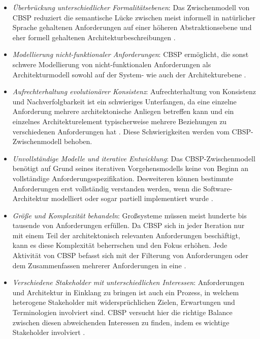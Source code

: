 \begin{itemize}
\item \textit{\"Uberbr\"uckung unterschiedlicher Formalit\"atsebenen}: Das Zwischenmodell von CBSP reduziert die semantische L\"ucke zwischen meist informell in nat\"urlicher Sprache gehaltenen Anforderungen auf einer h\"oheren Abstraktionsebene und eher formell gehaltenen Architekturbeschreibungen \cite{Gru01}.
\item \textit{Modellierung nicht-funktionaler Anforderungen}: CBSP erm\"oglicht, die sonst schwere Modellierung von nicht-funktionalen Anforderungen als Architekturmodell sowohl auf der System- wie auch der Architekturebene \cite{Gru01}. 
\item \textit{Aufrechterhaltung evolution\"arer Konsistenz}: Aufrechterhaltung von Konsistenz und Nachverfolgbarkeit ist ein schwieriges Unterfangen, da eine einzelne Anforderung mehrere architektonische Anliegen betreffen kann und ein einzelnes Architekturelement typischerweise mehrere Beziehungen zu verschiedenen Anforderungen hat \cite{Gru01}. Diese Schwierigkeiten werden vom CBSP-Zwischenmodell behoben.
\item \textit{Unvollst\"andige Modelle und iterative Entwicklung}: Das CBSP-Zwischenmodell ben\"otigt auf Grund seines iterativen Vorgehensmodells keine von Beginn an vollst\"andige Anforderungsspezifikation. Desweiteren k\"onnen bestimmte Anforderungen erst vollst\"andig verstanden werden, wenn die Software-Architektur modelliert oder sogar partiell implementiert wurde \cite{Gru01}.
\item \textit{Gr\"o\ss{}e und Komplexit\"at behandeln}: Gro\ss{}systeme m\"ussen meist hunderte bis tausende von Anforderungen erf\"ullen. Da CBSP sich in jeder Iteration nur mit einem Teil der architektonisch relevanten Anforderungen besch\"aftigt, kann es diese Komplexit\"at beherrschen und den Fokus erh\"ohen. Jede Aktivit\"at von CBSP befasst sich mit der Filterung von Anforderungen oder dem Zusammenfassen mehrerer Anforderungen in eine \cite{Gru01}.
\item \textit{Verschiedene Stakeholder mit unterschiedlichen Interessen}: Anforderungen und Architektur in Einklang zu bringen ist auch ein Prozess, in welchem heterogene Stakeholder mit widerspr\"uchlichen Zielen, Erwartungen und Terminologien involviert sind. CBSP versucht hier die richtige Balance zwischen diesen abweichenden Interessen zu finden, indem es wichtige Stakeholder involviert \cite{Gru01}. \\
\end{itemize}

